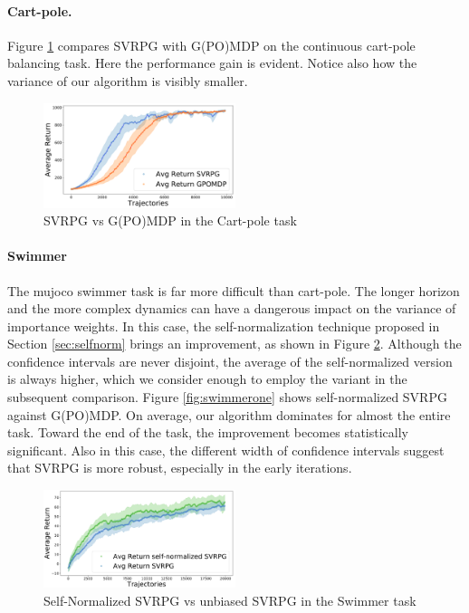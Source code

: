 \documentclass{article}
\theoremstyle{remark}
\theoremstyle{definition}
\begin{document}
\paragraph{Cart-pole.} Figure \ref{fig:cartpole} compares SVRPG with G(PO)MDP on the continuous cart-pole balancing task. Here the performance gain is evident. Notice also how the variance of our algorithm is visibly smaller.

\begin{figure}[t]
	\includegraphics[width=0.5\textwidth]{cart_pole_SVRPG_vs_GPOMDP}
	\caption{SVRPG vs G(PO)MDP in the Cart-pole task}
	\label{fig:cartpole}
\end{figure}

\paragraph{Swimmer} The mujoco swimmer task is far more difficult than cart-pole. The longer horizon and the more complex dynamics can have a dangerous impact on the variance of importance weights. In this case, the self-normalization technique proposed in Section \ref{sec:selfnorm} brings an improvement, as shown in Figure \ref{fig:swimmertwo}. Although the confidence intervals are never disjoint, the average of the self-normalized version is always higher, which we consider enough to employ the variant in the subsequent comparison. Figure \ref{fig:swimmerone} shows self-normalized SVRPG against G(PO)MDP. On average, our algorithm dominates for almost the entire task. Toward the end of the task, the improvement becomes statistically significant. Also in this case, the different width of confidence intervals suggest that SVRPG is more robust, especially in the early iterations.

\begin{figure}[t]
	\includegraphics[width=0.5\textwidth]{swimmer_self_normalized_SVRPG_vs_SVRPG}
	\caption{Self-Normalized SVRPG vs unbiased SVRPG in the Swimmer task}
	\label{fig:swimmertwo}
\end{figure}
\end{document}
